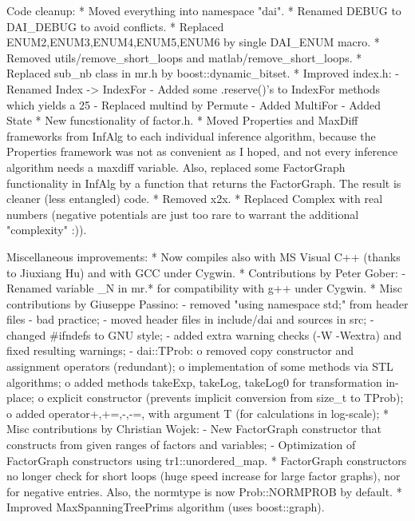 \begin{DoxyVerbInclude}
Code cleanup:
* Moved everything into namespace "dai".
* Renamed DEBUG to DAI_DEBUG to avoid conflicts.
* Replaced ENUM2,ENUM3,ENUM4,ENUM5,ENUM6 by single DAI_ENUM macro.
* Removed utils/remove_short_loops and matlab/remove_short_loops.
* Replaced sub_nb class in mr.h by boost::dynamic_bitset.
* Improved index.h:
  - Renamed Index -> IndexFor
  - Added some .reserve()'s to IndexFor methods which yields a
    25%
  - Replaced multind by Permute
  - Added MultiFor
  - Added State
* New funcstionality of factor.h.
* Moved Properties and MaxDiff frameworks from InfAlg to each individual
  inference algorithm, because the Properties framework was not as
  convenient as I hoped, and not every inference algorithm needs a maxdiff
  variable. Also, replaced some FactorGraph functionality in InfAlg by a
  function that returns the FactorGraph. The result is cleaner (less
  entangled) code.
* Removed x2x.
* Replaced Complex with real numbers (negative potentials are just too rare
  to warrant the additional "complexity" :)).

Miscellaneous improvements:
* Now compiles also with MS Visual C++ (thanks to Jiuxiang Hu) and with
  GCC under Cygwin.
* Contributions by Peter Gober:
  - Renamed variable _N in mr.* for compatibility with g++ under Cygwin.
* Misc contributions by Giuseppe Passino:
  - removed "using namespace std;" from header files - bad practice;
  - moved header files in include/dai and sources in src;
  - changed #ifndefs to GNU style;
  - added extra warning checks (-W -Wextra) and fixed resulting warnings;
  - dai::TProb:
    o removed copy constructor and assignment operators (redundant);
    o implementation of some methods via STL algorithms;
    o added methods takeExp, takeLog, takeLog0 for transformation in-place;
    o explicit constructor (prevents implicit conversion from size_t to TProb);
    o added operator+,+=,-,-=, with argument T (for calculations in log-scale);
* Misc contributions by Christian Wojek:
  - New FactorGraph constructor that constructs from given ranges of factors
    and variables;
  - Optimization of FactorGraph constructors using tr1::unordered_map.
* FactorGraph constructors no longer check for short loops (huge speed
  increase for large factor graphs), nor for negative entries. Also, the
  normtype is now Prob::NORMPROB by default.
* Improved MaxSpanningTreePrims algorithm (uses boost::graph).


\end{DoxyVerbInclude}
